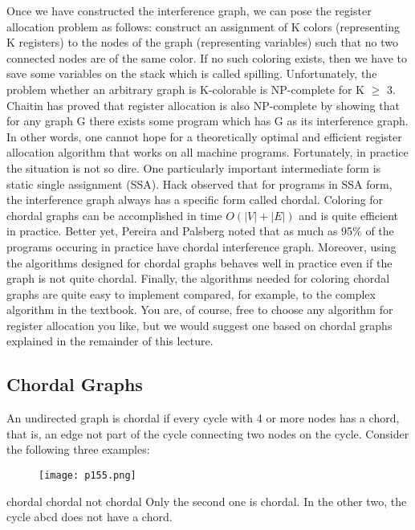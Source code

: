 Once we have constructed the interference graph, we can pose the register
allocation problem as follows: construct an assignment of K colors (representing K registers) to the nodes of the graph (representing variables)
such that no two connected nodes are of the same color. If no such coloring exists, then we have to save some variables on the stack which is called
spilling.
Unfortunately, the problem whether an arbitrary graph is K-colorable is
NP-complete for K $\geq$ 3. Chaitin\cite{chaitin1982register} has proved that register allocation
is also NP-complete by showing that for any graph G there exists some
program which has G as its interference graph. In other words, one cannot
hope for a theoretically optimal and efficient register allocation algorithm
that works on all machine programs.
Fortunately, in practice the situation is not so dire. One particularly
important intermediate form is static single assignment (SSA). Hack\cite{hack2006register}
observed that for programs in SSA form, the interference graph always has
a specific form called chordal. Coloring for chordal graphs can be accomplished in time $O(|V | + |E|)$ and is quite efficient in practice. Better yet,
Pereira and Palsberg\cite{pereira2005register} noted that as much as 95\% of the programs
occuring in practice have chordal interference graph. Moreover, using the
algorithms designed for chordal graphs behaves well in practice even if
the graph is not quite chordal. Finally, the algorithms needed for coloring
chordal graphs are quite easy to implement compared, for example, to the
complex algorithm in the textbook. You are, of course, free to choose any
algorithm for register allocation you like, but we would suggest one based
on chordal graphs explained in the remainder of this lecture.


\subsection{Chordal Graphs}

An undirected graph is chordal if every cycle with 4 or more nodes has a
chord, that is, an edge not part of the cycle connecting two nodes on the
cycle. Consider the following three examples:
\begin{figure}[H]
	\centering
	\texttt{[image: p155.png]}
	\caption{}
	\label{fig:p155}
\end{figure}

chordal chordal not chordal
Only the second one is chordal. In the other two, the cycle abcd does not
have a chord.

